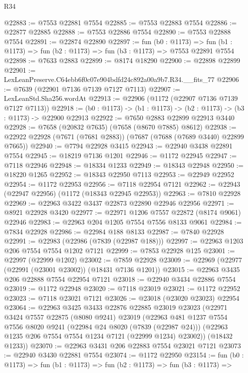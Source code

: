 \begin{lexlean}{R34}
\begin{coremodule}
@22883 := @7553 @22881 @7554
@22885 := @7553 @22883 @7554
@22886 := @22877 @22885
@22888 := @7553 @22886 @7554
@22890 := @7553 @22888 @7554
@22891 := @22874 @22890
@22897 := fun (b0 : @1173) =>
  fun (b1 : @1173) => fun (b2 : @1173) => fun (b3 : @1173) => @7553 @22891 @7554
@22898 := @7633 @2883
@22899 := @8174 @18290
@22900 := @22898 @22899
@22901 := LexLeanPreserve.C64ebb6f0c07e904bdfd24c892a00a9b7.R34.__fits_77
@22906 := @7639 (@22901 @7136 @7139 @7127 @7113)
@22907 := LexLeanStd.Sha256.wordAt
@22913 := @22906 (@1172 (@22907 @7136 @7139 @7127 @7113))
@22918 := (b0 : @1173) -> (b1 : @1173) -> (b2 : @1173) -> (b3 : @1173) -> @22900 @22913
@22922 := @7650 @2883 @22899 @22913 @3440
@22928 := @7658 (@20832 @7635) (@7658 (@8670 @7885) @8612)
@22938 := @22922 @22928 (@7671 (@7681 @2883)) (@7687 (@7688 (@7689 @3440) @22899 @7665))
@22940 := @7794 @22928 @3415
@22943 := @22940 @3438 @22891 @7554
@22945 := @18219 @7136 @1201
@22946 := @1172 @22945
@22947 := @7118 @22946
@22948 := @18334 @1233
@22949 := @18343 @22948
@22950 := @18220 @1265
@22952 := @18343 @22950 @7113
@22953 := @22949 @22952
@22954 := @1172 @22953
@22956 := @7118 @22954 @7121
@22962 := @22943 (@22947 @22956) (@1172 (@18343 @22945 @22953))
@22963 := @7810 @22928
@22969 := @22963 @3422 @3437 @22873 @22890 @22946 @22956
@22971 := @8921 @22928 @3420
@22977 := @22971 @1206 @7557 @22872 (@8174 @9061) @22946
@22983 := @22963 @204 @1205 @7554 @7556 @8133 @9061
@22984 := @7834 @22928
@22986 := @22984 @188 @8133
@22987 := @7840 @22928
@22991 := @22983 (@22986 (@7839 (@22987 @188)))
@22997 := @22963 @1203 @206 @7554 @7554 @1202 @7121
@22999 := @7853 @22928 @125
@23001 := @22997 (@22999 @1202)
@23002 := @7859 @22928
@23009 := @22969 (@22977 (@22991 (@23001 @23002)) (@18431 @7136 @1201))
@23015 := @22963 @3435 @206 @22888 @7554 @22954 @7121
@23018 := @22940 @3434 @22886 @7554
@23019 := @1172 @22948
@23020 := @7118 @23019
@23021 := @1172 @22952
@23023 := @7118 @23021 @7121
@23026 := @23018 (@23020 @23023) @22954
@23064 := @22963
    @3425
    @3433
    @22876
    @22885
    @23019
    @23023
    (@22971
      @3424
      @7557
      @22875
      (@8080 @9241)
      @23019
      (@22963
        @481
        @1237
        @7554
        @7556
        @8020
        @9241
        (@22984 @24 @8020 (@7839 (@22987 @24)))
        (@22963 @1235 @206 @7554 @7554 @1234 @7121 (@22999 @1234) @23002))
      (@18432 @1233))
@23070 := @22963 @3431 @206 @22883 @7554 @23021 @7121
@23073 := @22940 @3430 @22881 @7554
@23074 := @1172 @22950
@23154 := fun (b0 : @1173) =>
  fun (b1 : @1173) =>
  fun (b2 : @1173) =>
  fun (b3 : @1173) =>

\end{coremodule}
\end{lexlean}
